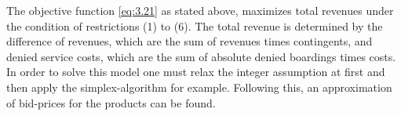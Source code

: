 The objective function \ref{eq:3.21} as stated above, maximizes total revenues under the condition of restrictions (1) to (6). The total revenue is determined by the difference of revenues, which are the sum of revenues times contingents, and denied service costs, which are the sum of absolute denied boardings times costs. In order to solve this model one must relax the integer assumption at first and then apply the simplex-algorithm for example. Following this, an approximation of bid-prices for the products can be found.